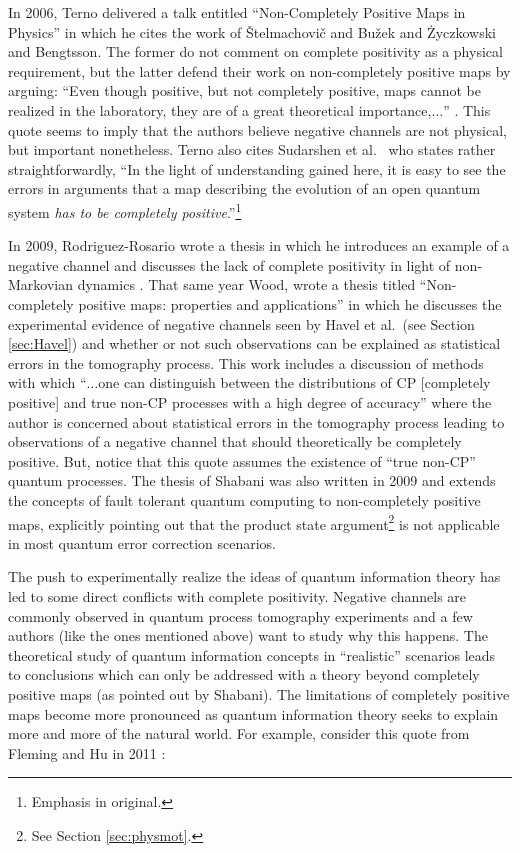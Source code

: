 In 2006, Terno delivered a talk entitled ``Non-Completely Positive Maps in Physics'' \cite{Terno2006} in which he cites the work of \v{S}telmachovi\v{c} and Bu\v{z}ek \cite{Buzek2001} and \.{Z}yczkowski and Bengtsson.  The former do not comment on complete positivity as a physical requirement, but the latter defend their work on non-completely positive maps by arguing: ``Even though positive, but not completely positive, maps cannot be realized in the laboratory, they are of a great theoretical importance,$\ldots$'' \cite{Zyczkowski2004}.  This quote seems to imply that the authors believe negative channels are not physical, but important nonetheless.  Terno also cites Sudarshen et al.\ \cite{Jordan2004} who states rather straightforwardly, ``In the light of understanding gained here, it is easy to see the errors in arguments that a map describing the evolution of an open quantum system {\em has to be completely positive}.''\footnote{Emphasis in original.}  

In 2009, Rodriguez-Rosario wrote a thesis in which he introduces an example of a negative channel and discusses the lack of complete positivity in light of non-Markovian dynamics \cite{Rodriguez2008}.  That same year Wood, wrote a thesis titled ``Non-completely positive maps: properties and applications'' \cite{Wood2009} in which he discusses the experimental evidence of negative channels seen by Havel et al.\ (see Section \ref{sec:Havel}) and whether or not such observations can be explained as statistical errors in the tomography process.  This work includes a discussion of methods with which ``$\ldots$one can distinguish between the distributions of CP [completely positive] and true non-CP processes with a high degree of accuracy'' where the author is concerned about statistical errors in the tomography process leading to observations of a negative channel that should theoretically be completely positive.  But, notice that this quote assumes the existence of ``true non-CP'' quantum processes.  The thesis of Shabani \cite{Shabani2009} was also written in 2009 and extends the concepts of fault tolerant quantum computing to non-completely positive maps, explicitly pointing out that the product state argument\footnote{See Section \ref{sec:physmot}.} is not applicable in most quantum error correction scenarios.  

The push to experimentally realize the ideas of quantum information theory has led to some direct conflicts with complete positivity.  Negative channels are commonly observed in quantum process tomography experiments and a few authors (like the ones mentioned above) want to study why this happens.  The theoretical study of quantum information concepts in ``realistic'' scenarios leads to conclusions which can only be addressed with a theory beyond completely positive maps (as pointed out by Shabani).  The limitations of completely positive maps become more pronounced as quantum information theory seeks to explain more and more of the natural world.  For example, consider this quote from Fleming and Hu in 2011 \cite{Fleming2012}:

